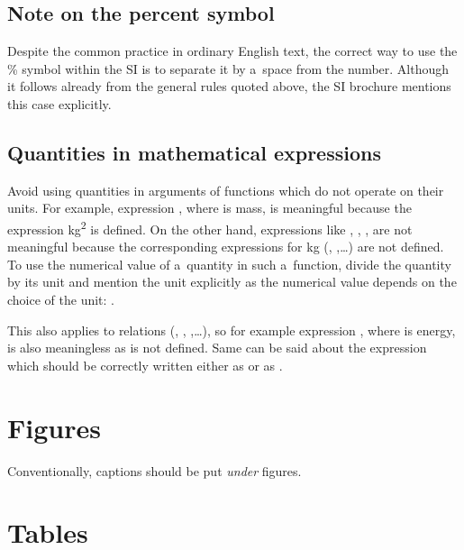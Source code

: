\documentclass[12pt,a4paper]{article}
\begin{document}
\subsection{Note on the percent symbol}

Despite the common practice in ordinary English text, the correct way to use the \si{\percent} symbol within the SI is to separate it by a~space from the number.
Although it follows already from the general rules quoted above, the SI brochure mentions this case explicitly.
~\cite[Sec.~5.4.7]{bipm-si-brochure}

\subsection{Quantities in mathematical expressions}

Avoid using quantities in arguments of functions which do not operate on their units.
For example, expression , where  is mass, is meaningful because the expression \si{\kg\squared} is defined.
On the other hand, expressions like , , ,  are not meaningful because the corresponding expressions for \si{\kg} (\ml{\si{\kg}+\si{\kg\squared}}, \ml{\sin{\si{\kg}}},\ldots) are not defined.
To use the numerical value of a~quantity in such a~function, divide the quantity by its unit and mention the unit explicitly as the numerical value depends on the choice of the unit: .

This also applies to relations (\ml{=}, \ml{<}, \ml{>},\ldots), so for example expression , where  is energy, is also meaningless as  is not defined.
Same can be said about the expression  which should be correctly written either as  or as .


\section{Figures}

Conventionally, captions should be put \emph{under} figures.


\section{Tables}
\end{document}
